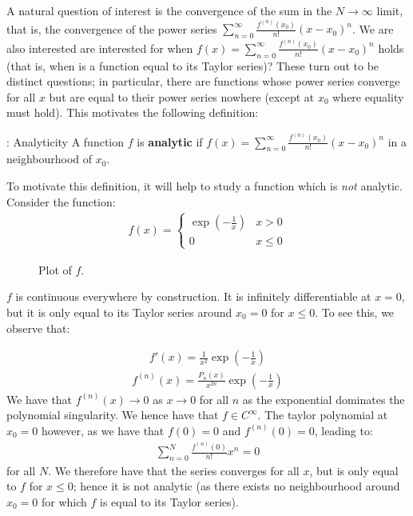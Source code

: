 A natural question of interest is the convergence of the sum in the $N \rightarrow \infty$ limit, that is, the convergence of the power series $\sum_{n = 0}^\infty \frac{f^{(n)}(x_0)}{n!}(x - x_0)^n$. We are also interested are interested for when $f(x) = \sum_{n = 0}^\infty \frac{f^{(n)}(x_0)}{n!}(x - x_0)^n$ holds (that is, when is a function equal to its Taylor series)? These turn out to be distinct questions; in particular, there are functions whose power series converge for all $x$ but are equal to their power series nowhere (except at $x_0$ where equality must hold). This motivates the following definition:
\begin{ndef}{: Analyticity}{}
    A function $f$ is \textbf{analytic} if $f(x) = \sum_{n=0}^\infty \frac{f^{(n)}(x_0)}{n!}(x - x_0)^n$ in a neighbourhood of $x_0$.
\end{ndef}
\noindent To motivate this definition, it will help to study a function which is \textit{not} analytic. Consider the function:
\begin{align*}
    f(x) = \begin{cases}
        \exp(-\frac{1}{x}) & x > 0
        \\ 0 & x \leq 0
    \end{cases}
\end{align*}
\begin{figure}[htbp]
    \centering
    \caption{Plot of $f$.}
    \label{fig23}
\end{figure}

\noindent $f$ is continuous everywhere by construction. It is infinitely differentiable at $x = 0$, but it is only equal to its Taylor series around $x_0 =0$ for $x \leq 0$. To see this, we observe that:

\begin{align*}
    f'(x) = \frac{1}{x^2}\exp(-\frac{1}{x})
\end{align*}
\begin{align*}
    f^{(n)}(x) = \frac{P_n(x)}{x^{2n}}\exp(-\frac{1}{x})
\end{align*}
We have that $f^{(n)}(x) \rightarrow 0$ as $x \rightarrow 0$ for all $n$ as the exponential dominates the polynomial singularity. We hence have that $f \in C^\infty$. The taylor polynomial at $x_0 = 0$ however, as we have that $f(0) = 0$ and $f^{(n)}(0) = 0$, leading to:
\begin{align*}
    \sum_{n=0}^N \frac{f^{(n)}(0)}{n!}x^n = 0
\end{align*}
for all $N$. We therefore have that the series converges for all $x$, but is only equal to $f$ for $x \leq 0$; hence it is not analytic (as there exists no neighbourhood around $x_0= 0$ for which $f$ is equal to its Taylor series). 

